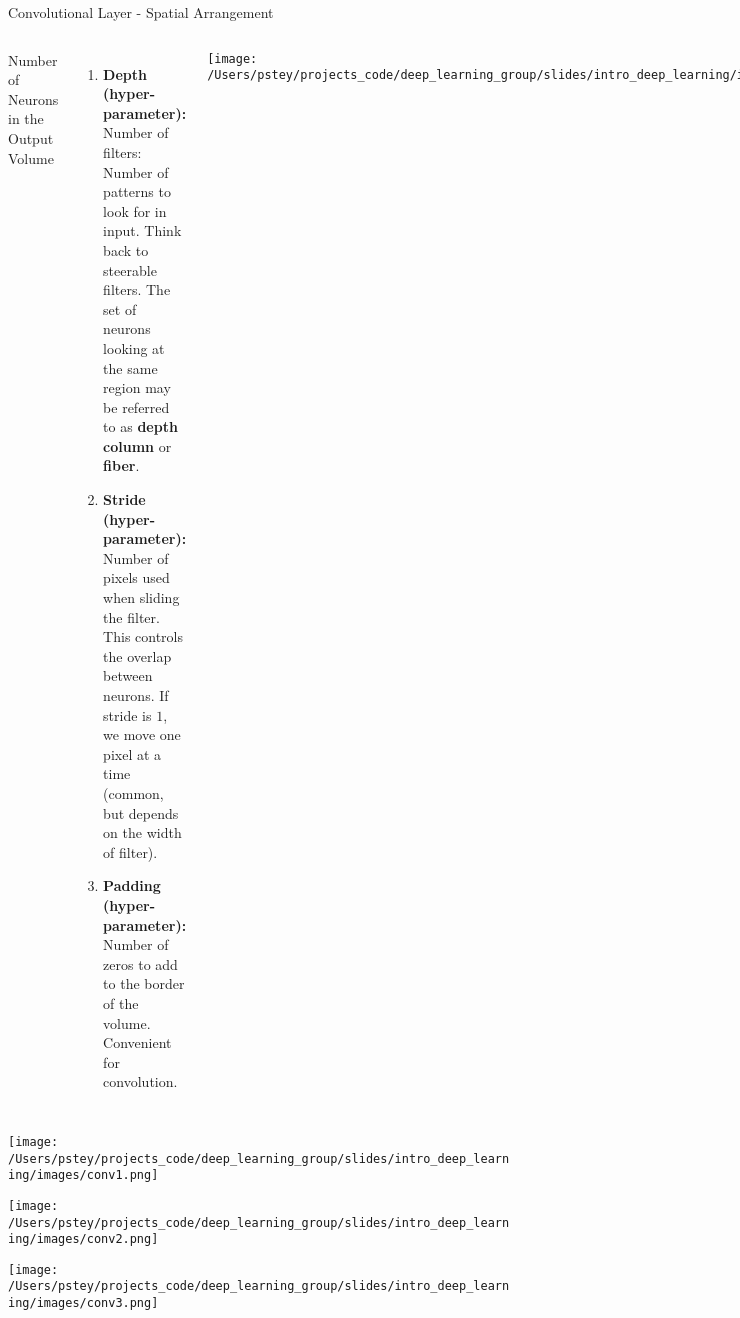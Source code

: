 \documentclass[pdf]{beamer}
\begin{document}
	\begin{frame}{Convolutional Layer - Spatial Arrangement}
	
	\vspace{1em}
	\begin{columns}
	\column{\dimexpr\paperwidth-10pt}
	Number of Neurons in the Output Volume
	\begin{enumerate}
		\item \textbf{Depth (hyper-parameter):} Number of filters: Number of patterns to look for in input. Think back to steerable filters. The set of neurons looking at the same region may be referred to as \textbf{depth column} or \textbf{fiber}.
		\vspace{1em}
		\item \textbf{Stride (hyper-parameter):} Number of pixels used when sliding the filter. This controls the overlap between neurons. If stride is $1$, we move one pixel at a time (common, but depends on the width of filter).
		\vspace{1em}
		\item \textbf{Padding (hyper-parameter):} Number of zeros to add to the border of the volume. Convenient for convolution.
		
	\end{enumerate}
	\begin{center}
		\texttt{[image: /Users/pstey/projects\_code/deep\_learning\_group/slides/intro\_deep\_learning/images/local\_connectivity.png]}
	\end{center}
	\end{columns}
	\end{frame}

	\begin{frame}
	\begin{center}
		\texttt{[image: /Users/pstey/projects\_code/deep\_learning\_group/slides/intro\_deep\_learning/images/conv1.png]}
	\end{center}
	\end{frame}
	
	\begin{frame}
	\begin{center}
		\texttt{[image: /Users/pstey/projects\_code/deep\_learning\_group/slides/intro\_deep\_learning/images/conv2.png]}
	\end{center}
	\end{frame}
		
	\begin{frame}
	\begin{center}
		\texttt{[image: /Users/pstey/projects\_code/deep\_learning\_group/slides/intro\_deep\_learning/images/conv3.png]}
	\end{center}
	\end{frame}
		
\end{document}
